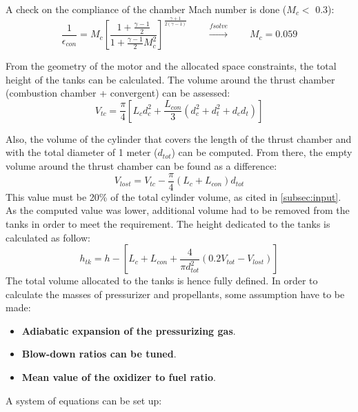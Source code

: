 A check on the compliance of the chamber Mach number is done ($M_c <$ 0.3):
\begin{equation}    
    \frac{1}{\epsilon_{con}} = M_c \left[ \frac{1 + \frac{\gamma - 1}{2}}{1 + \frac{\gamma - 1}{2} M_c^2} \right]^{\frac{\gamma + 1}{2(\gamma - 1)}}
    \qquad \xrightarrow{\textit{fsolve}} \qquad M_c = 0.059
\end{equation}

From the geometry of the motor and the allocated space constraints, the total height of the tanks can be calculated. The volume around the thrust chamber (combustion chamber + convergent) can be assessed:
\begin{equation}
    V_{tc} = \frac{\pi}{4} \left[L_c d_c^2  + \frac{L_{con}}{3} \left(d_c^2 + d_t^2 + d_c d_t\right)\right]
    \label{eq:v_tc}
\end{equation}

Also, the volume of the cylinder that covers the length of the thrust chamber and with the total diameter of 1 meter ($d_{tot}$) can be computed. From there, the empty volume around the thrust chamber can be found as a difference:
\begin{equation}
    V_{lost} =  V_{tc} - \frac{\pi}{4} \left(L_{c} + L_{con}\right) d_{tot}
\end{equation}
This value must be 20\% of the total cylinder volume, as cited in \autoref{subsec:input}. As the computed value was lower, additional volume had to be removed from the tanks in order to meet the requirement. The height dedicated to the tanks is calculated as follow:
\begin{equation}
    h_{tk} =  h - \left[L_{c} + L_{con} + \frac{4}{\pi d_{tot}^2}\left( 0.2 V_{tot} - V_{lost}\right) \right]
\end{equation}
The total volume allocated to the tanks is hence fully defined. 
In order to calculate the masses of pressurizer and propellants, some assumption have to be made:
\begin{itemize}
    \item \textbf{Adiabatic expansion of the pressurizing gas}.
    \item \textbf{Blow-down ratios can be tuned}.
    \item \textbf{Mean value of the oxidizer to fuel ratio}.
\end{itemize}

A system of equations can be set up:

